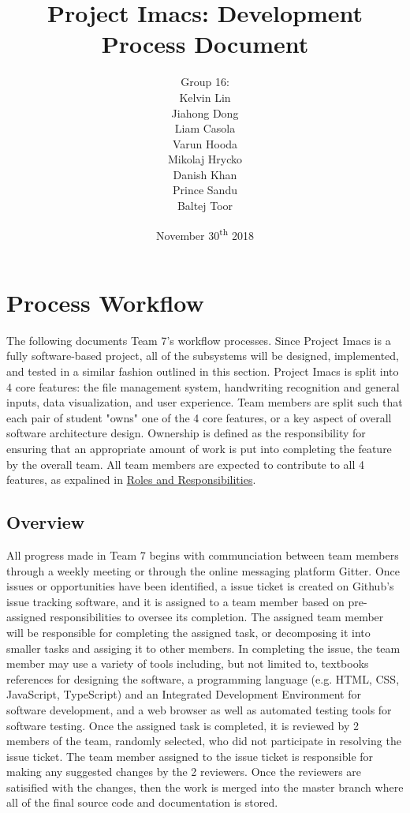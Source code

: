 \documentclass{article}
\title{Project Imacs: Development Process Document}
\author{Group 16:\\ Kelvin Lin\\ Jiahong Dong\\ Liam Casola\\ Varun Hooda\\ Mikolaj Hrycko\\ Danish Khan\\ Prince Sandu\\ Baltej Toor }
\date{November 30\textsuperscript{th} 2018}
\begin{document}
\maketitle
\newpage
\tableofcontents
\newpage

\section{Process Workflow}
\label{sec:process-workflow}
The following documents Team 7's workflow processes. Since Project Imacs is a fully software-based project, all of the subsystems will be designed, implemented, and tested in a similar fashion outlined in this section. Project Imacs is split into 4 core features: the file management system, handwriting recognition and general inputs, data visualization, and user experience. Team members are split such that each pair of student "owns" one of the 4 core features, or a key aspect of overall software architecture design. Ownership is defined as the responsibility for ensuring that an appropriate amount of work is put into completing the feature by the overall team. All team members are expected to contribute to all 4 features, as expalined in \hyperref[sec:roles-responsibilities]{Roles and Responsibilities}.

\subsection{Overview}
\label{sec:process-overview}
All progress made in Team 7 begins with communciation between team members through a weekly meeting or through the online messaging platform Gitter. Once issues or opportunities have been identified, a issue ticket is created on Github's issue tracking software, and it is assigned to a team member based on pre-assigned responsibilities to oversee its completion. The assigned team member will be responsible for completing the assigned task, or decomposing it into smaller tasks and assiging it to other members. In completing the issue, the team member may use a variety of tools including, but not limited to, textbooks references for designing the software, a programming language (e.g. HTML, CSS, JavaScript, TypeScript) and an Integrated Development Environment for software development, and a web browser as well as automated testing tools for software testing. Once the assigned task is completed, it is reviewed by 2 members of the team, randomly selected, who did not participate in resolving the issue ticket. The team member assigned to the issue ticket is responsible for making any suggested changes by the 2 reviewers. Once the reviewers are satisified with the changes, then the work is merged into the master branch where all of the final source code and documentation is stored.
\end{document}
